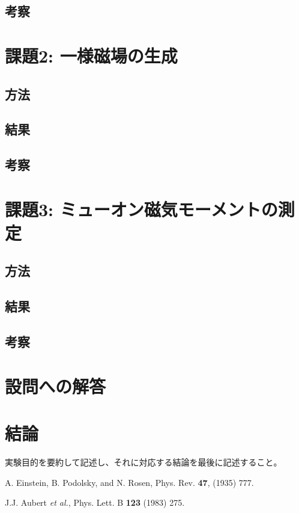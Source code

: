 \documentclass[uplatex,dvipdfmx,a4j,12pt]{jsarticle}
\begin{document}
\subsection{考察}

\section{課題2: 一様磁場の生成}
\subsection{方法}

\subsection{結果}

\subsection{考察}


\section{課題3: ミューオン磁気モーメントの測定}
\subsection{方法}

\subsection{結果}

\subsection{考察}

\section{設問への解答}


\section{結論}

実験目的を要約して記述し、それに対応する結論を最後に記述すること。

\begin{thebibliography}{9}

        A. Einstein, B. Podolsky, and N. Rosen, 
        Phys. Rev. \textbf{47}, (1935) 777.

        J.J. Aubert \textit{et al.},
        Phys. Lett. B \textbf{123} (1983) 275.
    
\end{thebibliography}
\end{document}
